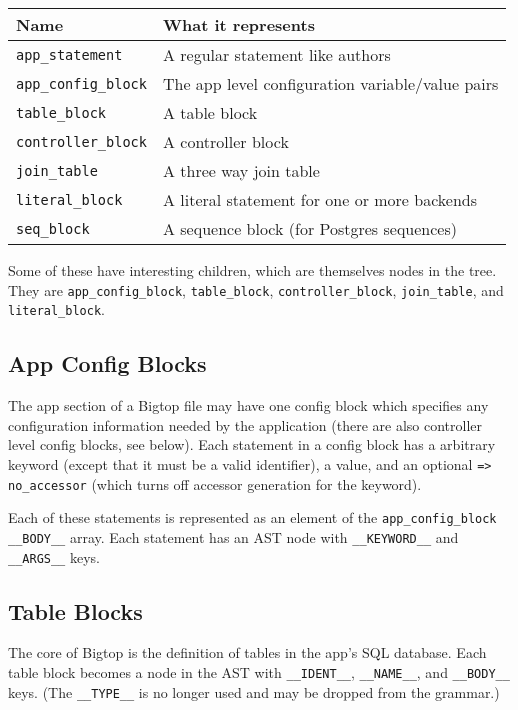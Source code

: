 \begin{tabular}{l|l}
Name & What it represents \\
\hline
\verb+app_statement+    & A regular statement like authors                 \\
\verb+app_config_block+ & The app level configuration variable/value pairs \\
\verb+table_block+      & A table block                                    \\
\verb+controller_block+ & A controller block                               \\
\verb+join_table+       & A three way join table                           \\
\verb+literal_block+    & A literal statement for one or more backends     \\
\verb+seq_block+        & A sequence block (for Postgres sequences)        \\
\end{tabular}

Some of these have interesting children, which are themselves nodes in the
tree.  They are \verb+app_config_block+, \verb+table_block+,
\verb+controller_block+, \verb+join_table+, and \verb+literal_block+.

\subsection*{App Config Blocks}

The app section of a Bigtop file may have one config block which specifies
any configuration information needed by the application (there are
also controller level config blocks, see below).  Each statement in a
config block has a arbitrary keyword (except that it must be a valid
identifier), a value, and an optional \verb+=> no_accessor+ (which turns
off accessor generation for the keyword).

Each of these statements is represented as an element of the
\verb+app_config_block+ \verb+__BODY__+ array.  Each statement has an AST
node with \verb+__KEYWORD__+ and \verb+__ARGS__+ keys.

\subsection*{Table Blocks}

The core of Bigtop is the definition of tables in the app's SQL database.
Each table block becomes a node in the AST with \verb+__IDENT__+,
\verb+__NAME__+, and \verb+__BODY__+ keys.  (The \verb+__TYPE__+ is
no longer used and may be dropped from the grammar.)

